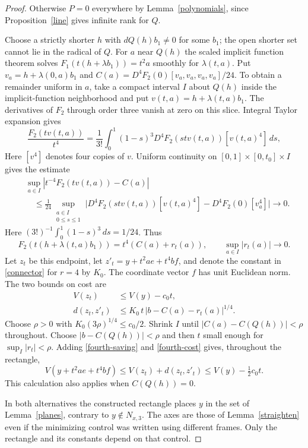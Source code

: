 \documentclass[11pt,letterpaper]{article}
\begin{document}
\begin{proof}
Otherwise $P=0$ everywhere by Lemma~\ref{polynomials}, since
Proposition~\ref{line} gives infinite rank for $Q$.

Choose a strictly shorter $h$ with $dQ(h)b_1\ne0$ for some $b_1$;
the open shorter set cannot lie in the radical of $Q$. For $a$ near
$Q(h)$ the scaled implicit function theorem solves
$F_1(t(h+\lambda b_1))=t^2a$ smoothly for $\lambda(t,a)$.
Put $v_a=h+\lambda(0,a)b_1$ and $C(a)=D^4F_2(0)[v_a,v_a,v_a,v_a]/24$.
To obtain a remainder uniform in $a$, take a compact interval $I$
about $Q(h)$ inside the implicit-function neighborhood and put
$v(t,a)=h+\lambda(t,a)b_1$. The derivatives of $F_2$ through order
three vanish at zero on this slice. Integral Taylor expansion gives
\[
 \frac{F_2(tv(t,a))}{t^4}
 =\frac1{3!}\int_0^1(1-s)^3
 D^4F_2(stv(t,a))[v(t,a)^4]\,ds ,
\]
Here $[v^4]$ denotes four copies of $v$. Uniform continuity on
$[0,1]\times[0,t_0]\times I$ gives the estimate
\[
 \begin{aligned}
 &\sup_{a\in I}|t^{-4}F_2(tv(t,a))-C(a)|\\
 &\quad\le\tfrac1{24}\sup_{\substack{a\in I\\0\le s\le1}}
 \big|D^4F_2(stv(t,a))[v(t,a)^4]-D^4F_2(0)[v_a^4]\big|
 \longrightarrow0 .
 \end{aligned}
\]
Here $(3!)^{-1}\int_0^1(1-s)^3\,ds=1/24$. Thus
\begin{equation}\label{fourth-output}
 F_2(t(h+\lambda(t,a)b_1))=t^4(C(a)+r_t(a)),\qquad
 \sup_{a\in I}|r_t(a)|\longrightarrow 0 .
\end{equation}
Let $z_t$ be this endpoint, let $z'_t=y+t^2ae+t^4bf$, and denote
the constant in \eqref{connector} for $r=4$ by $K_0$. The coordinate
vector $f$ has unit Euclidean norm. The two bounds on cost are
\begin{align}
 V(z_t)&\le V(y)-c_0t, \label{fourth-saving}\\
 d(z_t,z'_t)&\le K_0\,t\,|b-C(a)-r_t(a)|^{1/4}. \label{fourth-cost}
\end{align}
Choose $\rho>0$ with $K_0(3\rho)^{1/4}\le c_0/2$. Shrink $I$ until
$|C(a)-C(Q(h))|<\rho$ throughout. Choose $|b-C(Q(h))|<\rho$ and then
$t$ small enough for $\sup_I|r_t|<\rho$. Adding
\eqref{fourth-saving} and \eqref{fourth-cost} gives, throughout the rectangle,
\begin{equation}\label{box24}
 V(y+t^2ae+t^4bf)\le V(z_t)+d(z_t,z'_t)\le V(y)-\tfrac12 c_0t .
\end{equation}
This calculation also applies when $C(Q(h))=0$.

In both alternatives the constructed rectangle places $y$ in the set of
Lemma~\ref{planes}, contrary to $y\notin N_{x,3}$. The axes are those of
Lemma~\ref{straighten} even if the minimizing control was written using
different frames. Only the rectangle and its constants depend on that control.


\end{proof}
\end{document}
